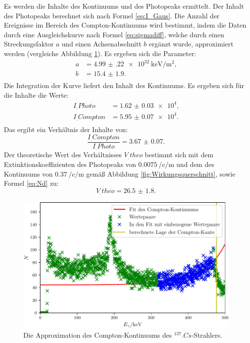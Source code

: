 \newpage
\noindent Es werden die Inhalte des Kontinuums und des Photopeaks ermittelt. Der Inhalt des Photopeaks berechnet sich nach Formel \eqref{eq:I_Gaus}. Die Anzahl der Ereignisse im Bereich des Compton-Kontinuums wird bestimmt, indem die Daten durch eine Ausgleichskurve nach Formel \eqref{eq:sigmadiff}, welche durch einen Streckungsfaktor $a$ und einen Achsenabschnitt $b$ ergänzt wurde, approximiert werden (vergleiche Abbildung \ref{fig:Comptonkontinuum}). Es ergeben sich die Parameter:
\begin{align*}
a	&= \SI{4.99(22)e32}{\kilo\electronvolt\per\metre\squared}\text{,}\\
b	&= \num{15.4(19)}\text{.}\\
\end{align*}
Die Integration der Kurve liefert den Inhalt des Kontinuums.
Es ergeben sich für die Inhalte die Werte:
\begin{align*}
I_.{Photo} 	 &= \num{1.62(3)e4}\text{,}\\
I_.{Compton} &= \num{5.95(7)e4}\text{.}\\
\end{align*} 
Das ergibt ein Verhältnis der Inhalte von:
\[
\frac{I_.{Compton}}{I_.{Photo}} = \num{3.67(7)}\text{.}
\]
Der theoretische Wert des Verhältnisses $V_.{theo}$ bestimmt sich mit dem Extinktionskoeffizienten des Photopeaks von $\SI{0.0075}{\per\centi\per\metre}$ und dem des Kontinuums von $\SI{0.37}{\per\centi\per\metre}$ gemäß Abbildung \ref{fig:Wirkungsquerschnitt}, sowie Formel \eqref{eq:Nd} zu: 
\[
V_.{theo} = \num{26.5(18)}\text{.}
\]

\begin{figure}
	\centering
	\includegraphics[width=\linewidth-60pt,height=\textheight-60pt,keepaspectratio]{content/images/Cs137Kon.pdf}
	\caption{Die Approximation des Compton-Kontinuums des $^{137}.{Cs}$-Strahlers.}
	\label{fig:Comptonkontinuum}
\end{figure}

